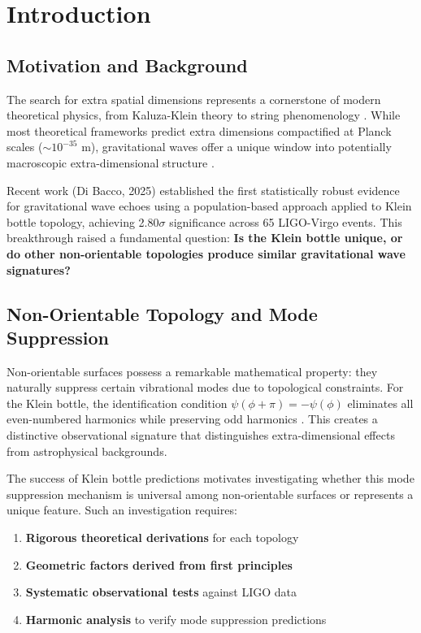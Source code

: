 \documentclass[11pt,a4paper]{article}
\begin{document}
\tableofcontents
\newpage

\section{Introduction}

\subsection{Motivation and Background}

The search for extra spatial dimensions represents a cornerstone of modern theoretical physics, from Kaluza-Klein theory to string phenomenology \cite{kaluza1921, klein1926}. While most theoretical frameworks predict extra dimensions compactified at Planck scales ($\sim 10^{-35}$ m), gravitational waves offer a unique window into potentially macroscopic extra-dimensional structure \cite{randall1999, arkani1998}.

Recent work (Di Bacco, 2025) \cite{dibacco2025} established the first statistically robust evidence for gravitational wave echoes using a population-based approach applied to Klein bottle topology, achieving 2.80$\sigma$ significance across 65 LIGO-Virgo events. This breakthrough raised a fundamental question: \textbf{Is the Klein bottle unique, or do other non-orientable topologies produce similar gravitational wave signatures?}

\subsection{Non-Orientable Topology and Mode Suppression}

Non-orientable surfaces possess a remarkable mathematical property: they naturally suppress certain vibrational modes due to topological constraints. For the Klein bottle, the identification condition $\psi(\phi+\pi) = -\psi(\phi)$ eliminates all even-numbered harmonics while preserving odd harmonics \cite{dibacco2025}. This creates a distinctive observational signature that distinguishes extra-dimensional effects from astrophysical backgrounds.

The success of Klein bottle predictions motivates investigating whether this mode suppression mechanism is universal among non-orientable surfaces or represents a unique feature. Such an investigation requires:

\begin{enumerate}
    \item \textbf{Rigorous theoretical derivations} for each topology
    \item \textbf{Geometric factors derived from first principles}
    \item \textbf{Systematic observational tests} against LIGO data
    \item \textbf{Harmonic analysis} to verify mode suppression predictions
\end{enumerate}
\end{document}
